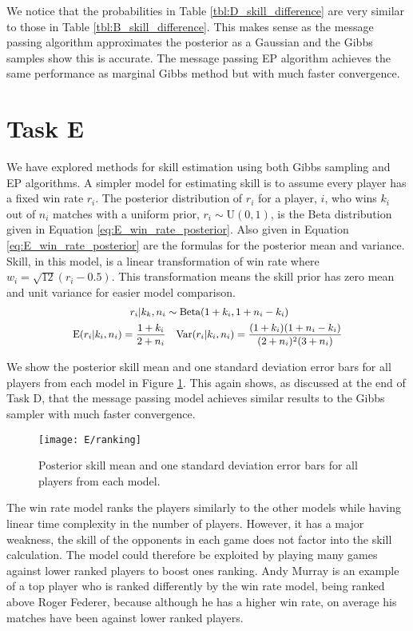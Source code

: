 \documentclass[11pt]{article}
\begin{document}
We notice that the probabilities in Table \ref{tbl:D_skill_difference} are very similar to those in Table \ref{tbl:B_skill_difference}. This makes sense as the message passing algorithm approximates the posterior as a Gaussian and the Gibbs samples show this is accurate. The message passing EP algorithm achieves the same performance as marginal Gibbs method but with much faster convergence.

\section{Task E}

We have explored methods for skill estimation using both Gibbs sampling and EP algorithms. A simpler model for estimating skill is to assume every player has a fixed win rate $r_i$. The posterior distribution of $r_i$ for a player, $i$, who wins $k_i$ out of $n_i$ matches with a uniform prior, $r_i \sim \text{U}(0,1)$, is the Beta distribution given in Equation \ref{eq:E_win_rate_posterior}. Also given in Equation \ref{eq:E_win_rate_posterior} are the formulas for the posterior mean and variance. Skill, in this model, is a linear transformation of win rate where $w_i = \sqrt{12}(r_i - 0.5)$. This transformation means the skill prior has zero mean and unit variance for easier model comparison.
\begin{equation}
    \small
    \begin{split}
        r_i|k_k,n_i &\sim \text{Beta}(1+k_i, 1+n_i-k_i) \\
        \text{E}(r_i|k_i,n_i) = \frac{1+k_i}{2+n_i} &\quad \text{Var}(r_i|k_i,n_i) = \frac{(1+k_i)(1+n_i-k_i)}{(2+n_i)^2(3+n_i)}
    \end{split}
    \label{eq:E_win_rate_posterior}
\end{equation}

We show the posterior skill mean and one standard deviation error bars for all players from each model in Figure \ref{fig:E_ranking}. This again shows, as discussed at the end of Task D, that the message passing model achieves similar results to the Gibbs sampler with much faster convergence. 

\begin{figure}
    \centering
    \texttt{[image: E/ranking]}
    \caption{Posterior skill mean and one standard deviation error bars for all players from each model.}
    \label{fig:E_ranking}
\end{figure}

The win rate model ranks the players similarly to the other models while having linear time complexity in the number of players. However, it has a major weakness, the skill of the opponents in each game does not factor into the skill calculation. The model could therefore be exploited by playing many games against lower ranked players to boost ones ranking. Andy Murray is an example of a top player who is ranked differently by the win rate model, being ranked above Roger Federer, because although he has a higher win rate, on average his matches have been against lower ranked players. 
\end{document}
